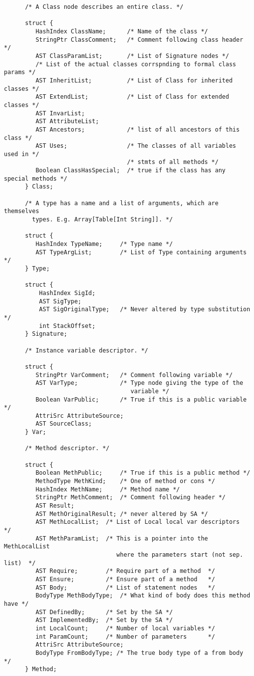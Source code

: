 {\begin{verbatim}
      /* A Class node describes an entire class. */

      struct {
         HashIndex ClassName;      /* Name of the class */
         StringPtr ClassComment;   /* Comment following class header */
         AST ClassParamList;       /* List of Signature nodes */
         /* List of the actual classes corrspnding to formal class params */  
         AST InheritList;          /* List of Class for inherited classes */
         AST ExtendList;           /* List of Class for extended classes */
         AST InvarList;
         AST AttributeList;
         AST Ancestors;            /* list of all ancestors of this class */
         AST Uses;                 /* The classes of all variables used in */
                                   /* stmts of all methods */
         Boolean ClassHasSpecial;  /* true if the class has any special methods */
      } Class;

      /* A type has a name and a list of arguments, which are themselves
        types. E.g. Array[Table[Int String]]. */

      struct {
         HashIndex TypeName;     /* Type name */
         AST TypeArgList;        /* List of Type containing arguments */
      } Type;

      struct {
          HashIndex SigId;
          AST SigType;
          AST SigOriginalType;   /* Never altered by type substitution */
          int StackOffset;
      } Signature;

      /* Instance variable descriptor. */

      struct {
         StringPtr VarComment;   /* Comment following variable */
         AST VarType;            /* Type node giving the type of the
                                    variable */
         Boolean VarPublic;      /* True if this is a public variable */
         AttriSrc AttributeSource;
         AST SourceClass;
      } Var;

      /* Method descriptor. */

      struct {
         Boolean MethPublic;     /* True if this is a public method */
         MethodType MethKind;    /* One of method or cons */
         HashIndex MethName;     /* Method name */
         StringPtr MethComment;  /* Comment following header */
         AST Result;
         AST MethOriginalResult; /* never altered by SA */
         AST MethLocalList;  /* List of Local local var descriptors         */
         AST MethParamList;  /* This is a pointer into the MethLocalList 
                                where the parameters start (not sep. list)  */
         AST Require;        /* Require part of a method  */
         AST Ensure;         /* Ensure part of a method   */
         AST Body;           /* List of statement nodes   */
         BodyType MethBodyType;  /* What kind of body does this method have */
         AST DefinedBy;      /* Set by the SA */
         AST ImplementedBy;  /* Set by the SA */
         int LocalCount;     /* Number of local variables */
         int ParamCount;     /* Number of parameters      */
         AttriSrc AttributeSource;
         BodyType FromBodyType;	/* The true body type of a from body */
      } Method;


\end{verbatim}}
